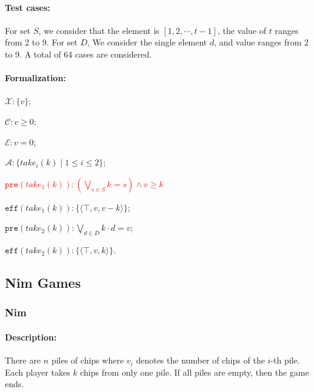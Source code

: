 \documentclass[review]{elsarticle}
\newcommand{\set}[1]{\{ #1 \}}
\newcommand{\tuple}[1]{\langle {#1} \rangle}
\newcommand{\true}{\top}
\newcommand{\statevar}{\mathcal{X}}
\newcommand{\act}{\mathcal{A}}
\newcommand{\constraint}{\mathcal{C}}
\newcommand{\estate}{\mathcal{E}}
\newcommand{\pre}{\mathtt{pre}}
\newcommand{\eff}{\mathtt{eff}}
\begin{document}
\paragraph{Test cases:} For set $S$, we consider that the element is $[1,2,\cdots,t-1]$, the value of $t$ ranges from 2 to 9. 
For set $D$, We consider the single element $d$, and value ranges from 2 to 9. 
A total of 64 cases are considered. 


\paragraph{Formalization:}

\begin{itemize}
	\item $\statevar: \set{v}$;
	\item $\constraint: v \ge 0$;
	\item $\estate: v=0$;
	\item $\act:\set{take_i(k){\mid} 1\le i\le2}$;
	\textcolor{red}{\item $\pre(take_1(k)) :(\bigvee_{s \in S} k = s) \land v \geq k$}
	\item $\eff(take_1(k)) : \set{\tuple{\true, v, v-k}}$;
	\item $\pre(take_2(k)) :   \bigvee_{d \in D}k \cdot d = v$;
	\item $\eff(take_2(k)) : \set{\tuple{\true, v, k}}$.
\end{itemize}

\subsection{Nim Games}


\subsubsection{Nim \protect\cite{Bou1901}}
\paragraph{Description:}
There are $n$ piles of chips where $v_i$ denotes the number of chips of the $i$-th pile.
Each player takes $k$ chips from only one pile. %
If all piles are empty, then the game ends.
\end{document}
